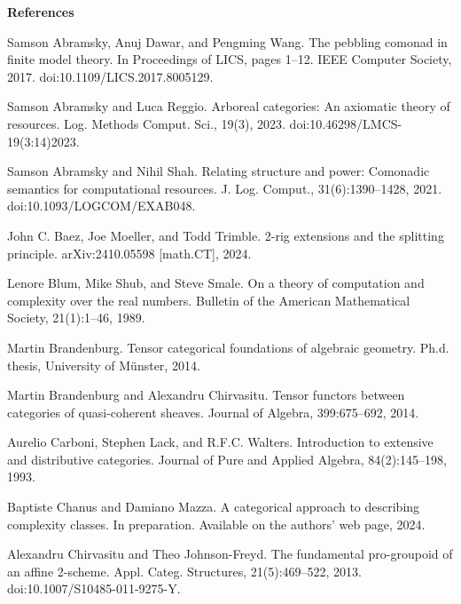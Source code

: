 
 
\par\medskip\noindent\textbf{References}\par
  
\par\noindent  [1]  Samson Abramsky, Anuj Dawar, and Pengming Wang.  The pebbling comonad in finite model theory.  In Proceedings of LICS, pages 1–12. IEEE Computer Society, 2017.  doi:10.1109/LICS.2017.8005129.  
 
\par\noindent  [2]  Samson Abramsky and Luca Reggio.  Arboreal categories: An axiomatic theory of resources.  Log. Methods Comput. Sci., 19(3), 2023.  doi:10.46298/LMCS-19(3:14)2023.  
 
\par\noindent  [3]  Samson Abramsky and Nihil Shah.  Relating structure and power: Comonadic semantics for computational resources.  J. Log. Comput., 31(6):1390–1428, 2021.  doi:10.1093/LOGCOM/EXAB048.  
 
\par\noindent  [4]  John C. Baez, Joe Moeller, and Todd Trimble.  2-rig extensions and the splitting principle.  arXiv:2410.05598 [math.CT], 2024.  
 
\par\noindent  [5]  Lenore Blum, Mike Shub, and Steve Smale.  On a theory of computation and complexity over the real numbers.  Bulletin of the American Mathematical Society, 21(1):1–46, 1989.  
 
\par\noindent  [6]  Martin Brandenburg.  Tensor categorical foundations of algebraic geometry.  Ph.d. thesis, University of Münster, 2014.  
 
\par\noindent  [7]  Martin Brandenburg and Alexandru Chirvasitu.  Tensor functors between categories of quasi-coherent sheaves.  Journal of Algebra, 399:675–692, 2014.  
 
\par\noindent  [8]  Aurelio Carboni, Stephen Lack, and R.F.C. Walters.  Introduction to extensive and distributive categories.  Journal of Pure and Applied Algebra, 84(2):145–198, 1993.  
 
\par\noindent  [9]  Baptiste Chanus and Damiano Mazza.  A categorical approach to describing complexity classes.  In preparation. Available on the authors’ web page, 2024.  
 
\par\noindent  [10]  Alexandru Chirvasitu and Theo Johnson-Freyd.  The fundamental pro-groupoid of an affine 2-scheme.  Appl. Categ. Structures, 21(5):469–522, 2013.  doi:10.1007/S10485-011-9275-Y.  
 
